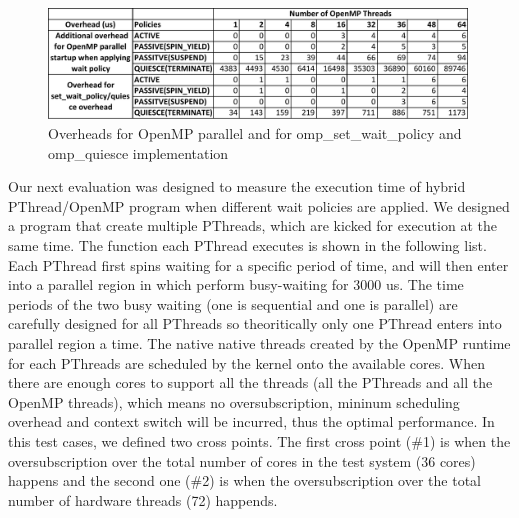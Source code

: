 \begin{figure}[ht]
    \includegraphics[width=0.99\textwidth] {images/parallel_set_quiesce_overhead}
    \caption{Overheads for OpenMP parallel and for {\sf omp\_set\_wait\_policy} and {\sf omp\_quiesce} implementation}
    \label{omp:overhead_table}
\end{figure}


Our next evaluation was designed to measure the execution time of hybrid PThread/OpenMP program when different
wait policies are applied. We designed a program that create multiple PThreads, which are kicked for execution 
at the same time. The function each PThread executes is shown in the following list. 
Each PThread first spins waiting for a specific period of time, and will 
then enter into a parallel region in which perform busy-waiting for 3000 us.
The time periods of the two busy waiting (one is sequential and one is parallel) are carefully designed for
all PThreads so theoritically only one PThread enters into parallel region a time. The native 
native threads created by the OpenMP runtime for each PThreads are scheduled by the kernel onto the available 
cores. When there are enough cores to support all the threads (all the PThreads and all the OpenMP threads),
which means no oversubscription, mininum scheduling overhead and context switch will be incurred, thus the optimal 
performance. In this test cases, we defined two cross points. The first cross point (\#1) is when the oversubscription
over the total number of cores in the test system (36 cores) happens and the second one (\#2) is when the oversubscription
over the total number of hardware threads (72) happends. 


